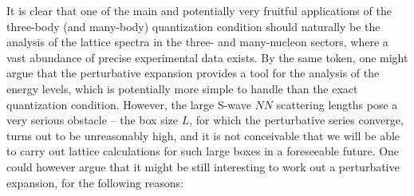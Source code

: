 \documentclass[12pt,prd,tightenlines,nofootinbib]{revtex4-2}
\begin{document}
It is clear that one of the main and potentially very fruitful applications
of the three-body (and many-body) quantization
condition should naturally
be the analysis of the lattice spectra in the three- and many-nucleon
sectors, where a vast abundance of precise experimental data exists. By the same token,
one might argue that the perturbative expansion provides
a tool for the analysis of the energy levels,
which is potentially more simple to handle than the exact quantization condition.
However, the large S-wave $NN$ scattering
lengths pose a very serious obstacle -- the box size $L$, for which the perturbative series
converge, turns out to be unreasonably high, and it is not conceivable that we will be able
to carry out lattice calculations for such large boxes in a foreseeable future.
One could however argue that it might be
still interesting to work out a perturbative expansion, for the following
reasons:
\end{document}
